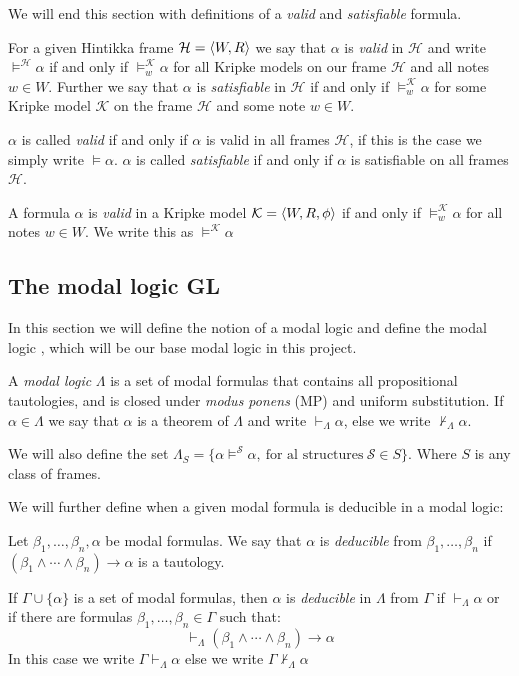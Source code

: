\documentclass[../main.tex]{subfiles}
\begin{document}
We will end this section with definitions of a \textit{valid} and
\textit{satisfiable} formula.
\begin{defi}
For a given Hintikka frame $\mathcal{H}=\langle W,R\rangle$ we say that $\alpha$ is
\textit{valid} in $\mathcal{H}$ and write $\vDash^\mathcal{H}\alpha$ if and only if
$\vDash^\mathcal{K}_w\alpha$ for all Kripke models on our frame $\mathcal{H}$ and all
notes $w\in W$. Further we say that $\alpha$ is \textit{satisfiable} in $\mathcal{H}$
if and only if $\vDash^\mathcal{K}_w\alpha$ for some Kripke model $\mathcal{K}$ on
the frame $\mathcal{H}$ and some note $w\in W$.

$\alpha$ is called \textit{valid} if and only if $\alpha$ is valid in all frames
$\mathcal{H}$, if this is the case we simply write $\vDash\alpha$. $\alpha$ is
called \textit{satisfiable} if and only if $\alpha$ is satisfiable on all frames
$\mathcal{H}$.

A formula $\alpha$ is \textit{valid} in a Kripke model $\mathcal{K}=\langle
W,R,\phi\rangle$ if and only if $\vDash^\mathcal{K}_w\alpha$ for all notes $w\in
W$. We write this as $\vDash^\mathcal{K}\alpha$
\end{defi}
\subsection{The modal logic GL}
In this section we will define the notion of a modal logic and define the modal
logic \GL, which will be our base modal logic in this project.
\begin{defi}
	A \textit{modal logic} $\Lambda$ is a set of modal formulas that contains all
	propositional tautologies, and is closed under \textit{modus ponens}
	(MP) and uniform substitution. If $\alpha\in\Lambda$ we say that
	$\alpha$ is a theorem of $\Lambda$ and write $\vdash_\Lambda\alpha$,
	else we write $\not\vdash_\Lambda\alpha$.

	We will also define the set
	$\Lambda_S=\{\alpha\vDash^\mathcal{S}\alpha,\ \text{for al structures}\
	\mathcal{S}\in S\}$. Where $S$ is any class of frames.
\end{defi}
We will further define when a given modal formula is deducible in a modal
logic:
\begin{defi}
	Let $\beta_1,\ldots,\beta_n,\alpha$ be modal formulas. We say that
	$\alpha$ is \textit{deducible} from $\beta_1,\ldots,\beta_n$ if
	$(\beta_1\wedge\cdots\wedge\beta_n)\rightarrow\alpha$ is a tautology.

	If $\Gamma\cup\{\alpha\}$ is a set of modal formulas, then $\alpha$ is
	\textit{deducible} in $\Lambda$ from $\Gamma$ if $\vdash_\Lambda\alpha$ or if
	there are formulas $\beta_1,\ldots,\beta_n\in\Gamma$ such that:
	\[\vdash_\Lambda(\beta_1\wedge\cdots\wedge\beta_n)\rightarrow\alpha\]
	In this case we write $\Gamma\vdash_\Lambda\alpha$ else we write
	$\Gamma\not\vdash_\Lambda\alpha$	
\end{defi}
\end{document}
